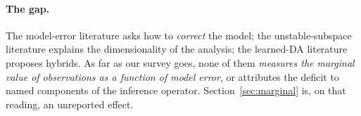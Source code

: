 \paragraph{The gap.}
The model-error literature asks how to \emph{correct} the model; the
unstable-subspace literature explains the dimensionality of the analysis; the
learned-DA literature proposes hybrids. As far as our survey goes, none of them
\emph{measures the marginal value of observations as a function of model error},
or attributes the deficit to named components of the inference operator.
Section~\ref{sec:marginal} is, on that reading, an unreported effect.
